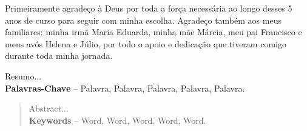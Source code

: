 \documentclass[]{politex}
\begin{document}
\capa
\falsafolhaderosto
\folhaderosto








\begin{agradecimentos}

Primeiramente agradeço à Deus por toda a força necessária ao longo desses 5 anos de curso para seguir com minha escolha. Agradeço também aos meus familiares: minha irmã Maria Eduarda, minha mãe Márcia, meu pai Francisco e meus avós Helena e Júlio, por todo o apoio e dedicação que tiveram comigo durante toda minha jornada.

\end{agradecimentos}




\begin{resumo}
Resumo...
%
\\[3\baselineskip]
%
\textbf{Palavras-Chave} -- Palavra, Palavra, Palavra, Palavra, Palavra.
\end{resumo}


\begin{abstract}
Abstract...
%
\\[3\baselineskip]
%
\textbf{Keywords} -- Word, Word, Word, Word, Word.
\end{abstract}


\listadefiguras
\listadetabelas

\lstlistoflistings

\sumario
\end{document}
